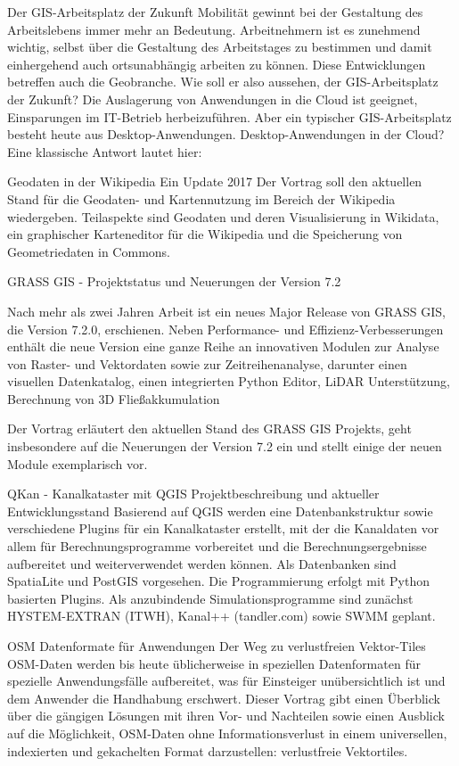 %
{Der GIS-Arbeitsplatz der Zukunft}%
{}%
{Mobilität gewinnt bei der Gestaltung des Arbeitslebens immer mehr an Bedeutung. Arbeitnehmern ist
es zunehmend wichtig, selbst über die Gestaltung des Arbeitstages zu bestimmen und damit
einhergehend auch ortsunabhängig arbeiten zu können. Diese Entwicklungen betreffen auch die
Geobranche. Wie soll er also aussehen, der GIS-Arbeitsplatz der Zukunft?  Die Auslagerung von
Anwendungen in die Cloud ist geeignet, Einsparungen im IT-Betrieb herbeizuführen. Aber ein typischer
GIS-Arbeitsplatz besteht heute aus Desktop-Anwendungen. Desktop-Anwendungen in der Cloud? Eine
klassische Antwort lautet hier:}

%
{Geodaten in der Wikipedia}%
{Ein Update 2017}%
{Der Vortrag soll den aktuellen Stand für die Geodaten- und Kartennutzung im Bereich der Wikipedia
wiedergeben. Teilaspekte sind Geodaten und deren Visualisierung in Wikidata, ein graphischer
Karteneditor für die Wikipedia und die Speicherung von Geometriedaten in Commons.  }


%
{GRASS GIS - Projektstatus und Neuerungen der Version 7.2}%
{}%
{Nach mehr als zwei Jahren Arbeit ist ein neues Major Release von GRASS GIS, die Version 7.2.0,
  erschienen. Neben Performance- und Effizienz-Verbesserungen enthält die neue Version eine ganze
  Reihe an innovativen Modulen zur Analyse von Raster- und Vektordaten sowie zur Zeitreihenanalyse,
  darunter einen visuellen Datenkatalog, einen integrierten Python Editor, LiDAR Unterstützung,
  Berechnung von 3D Fließakkumulation

Der Vortrag erläutert den aktuellen Stand des GRASS GIS Projekts, geht insbesondere auf die
Neuerungen der Version 7.2 ein und stellt einige der neuen Module exemplarisch vor.
}

%
{QKan - Kanalkataster mit QGIS}%
{Projektbeschreibung und aktueller Entwicklungsstand}%
{Basierend auf QGIS werden eine Datenbankstruktur sowie verschiedene Plugins für ein Kanalkataster
erstellt, mit der die Kanaldaten vor allem für Berechnungsprogramme vorbereitet und die
Berechnungsergebnisse aufbereitet und weiterverwendet werden können. Als Datenbanken sind SpatiaLite
und PostGIS vorgesehen. Die Programmierung erfolgt mit Python basierten Plugins. Als anzubindende
Simulationsprogramme sind zunächst HYSTEM-EXTRAN (ITWH), Kanal++ (tandler.com) sowie SWMM geplant. }

%
{OSM Datenformate für Anwendungen}%
{Der Weg zu verlustfreien Vektor-Tiles}%
{OSM-Daten werden bis heute üblicherweise in speziellen Datenformaten für spezielle Anwendungsfälle
aufbereitet, was für Einsteiger unübersichtlich ist und dem Anwender die Handhabung erschwert.
Dieser Vortrag gibt einen Überblick über die gängigen Lösungen mit ihren Vor- und Nachteilen sowie
einen Ausblick auf die Möglichkeit, OSM-Daten ohne Informationsverlust in einem universellen,
indexierten und gekachelten Format darzustellen: verlustfreie Vektortiles.  }

